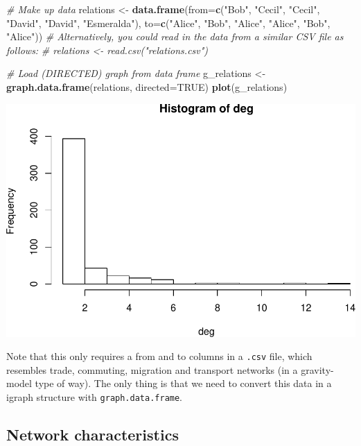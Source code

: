 \documentclass[]{article}
\newenvironment{Shaded}{\begin{snugshade}}{\end{snugshade}}
\newcommand{\KeywordTok}[1]{\textcolor[rgb]{0.13,0.29,0.53}{\textbf{{#1}}}}
\newcommand{\DataTypeTok}[1]{\textcolor[rgb]{0.13,0.29,0.53}{{#1}}}
\newcommand{\StringTok}[1]{\textcolor[rgb]{0.31,0.60,0.02}{{#1}}}
\newcommand{\CommentTok}[1]{\textcolor[rgb]{0.56,0.35,0.01}{\textit{{#1}}}}
\newcommand{\OtherTok}[1]{\textcolor[rgb]{0.56,0.35,0.01}{{#1}}}
\newcommand{\NormalTok}[1]{{#1}}
\begin{document}
\begin{Shaded}
\begin{Highlighting}[]
\CommentTok{# Make up data}
\NormalTok{relations <-}\StringTok{ }\KeywordTok{data.frame}\NormalTok{(}\DataTypeTok{from=}\KeywordTok{c}\NormalTok{(}\StringTok{"Bob"}\NormalTok{, }\StringTok{"Cecil"}\NormalTok{, }\StringTok{"Cecil"}\NormalTok{, }\StringTok{"David"}\NormalTok{, }\StringTok{"David"}\NormalTok{, }\StringTok{"Esmeralda"}\NormalTok{),}
                        \DataTypeTok{to=}\KeywordTok{c}\NormalTok{(}\StringTok{"Alice"}\NormalTok{, }\StringTok{"Bob"}\NormalTok{, }\StringTok{"Alice"}\NormalTok{, }\StringTok{"Alice"}\NormalTok{, }\StringTok{"Bob"}\NormalTok{, }\StringTok{"Alice"}\NormalTok{))}
\CommentTok{# Alternatively, you could read in the data from a similar CSV file as follows:}
\CommentTok{# relations <- read.csv("relations.csv")}

\CommentTok{# Load (DIRECTED) graph from data frame }
\NormalTok{g_relations <-}\StringTok{ }\KeywordTok{graph.data.frame}\NormalTok{(relations, }\DataTypeTok{directed=}\OtherTok{TRUE}\NormalTok{)}
\KeywordTok{plot}\NormalTok{(g_relations)}
\end{Highlighting}
\end{Shaded}

\includegraphics{ResearchTools_files/figure-latex/unnamed-chunk-56-1.pdf}

Note that this only requires a from and to columns in a \texttt{.csv}
file, which resembles trade, commuting, migration and transport networks
(in a gravity-model type of way). The only thing is that we need to
convert this data in a igraph structure with \texttt{graph.data.frame}.

\subsection{Network characteristics}\label{network-characteristics}
\end{document}
